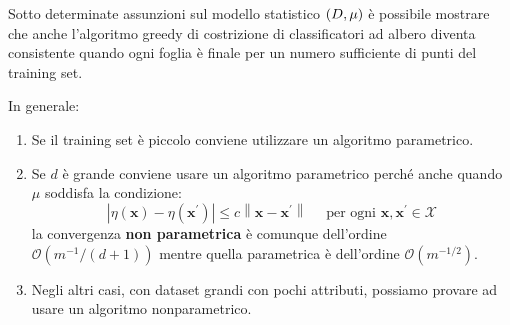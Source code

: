 \documentclass[\main/main.tex]{subfiles}
\begin{document}
\begin{multicols}{2}
\begin{example}
    Sotto determinate assunzioni sul modello statistico \(\left(D, \mu\right)\) è possibile mostrare che anche l'algoritmo greedy di costrizione di classificatori ad albero diventa consistente quando ogni foglia è finale per un numero sufficiente di punti del training set.
\end{example}
\begin{observation}
    In generale:
    \begin{enumerate}
        \item Se il training set è piccolo conviene utilizzare un algoritmo parametrico.
        \item Se \(d\) è grande conviene usare un algoritmo parametrico perché anche quando \(\mu\) soddisfa la condizione:
        \[
            \left|\eta(\boldsymbol{x})-\eta\left(\boldsymbol{x}^{\prime}\right)\right| \leq c\left\|\boldsymbol{x}-\boldsymbol{x}^{\prime}\right\| \quad \text { per ogni } \boldsymbol{x}, \boldsymbol{x}^{\prime} \in \mathcal{X}
        \]
        la convergenza \textbf{non parametrica} è comunque dell'ordine \(\mathcal{O}\left(m^{-1} /(d+1)\right)\) mentre quella parametrica è dell'ordine \(\mathcal{O}\left(m^{-1 / 2}\right)\).
        \item Negli altri casi, con dataset grandi con pochi attributi, possiamo provare ad usare un algoritmo nonparametrico.
    \end{enumerate}
\end{observation}
\end{multicols}
\end{document}
